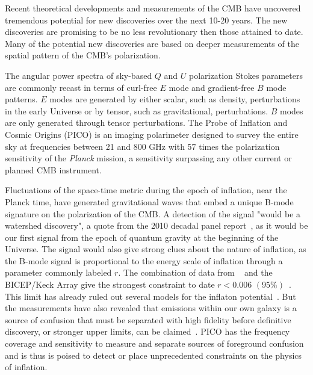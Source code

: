\documentclass[PICOReport.tex]{subfiles}
\begin{document}

Recent theoretical developments and measurements of the \ac{CMB} 
have uncovered tremendous potential for new discoveries over the next 10-20 years. The new discoveries are promising to be 
no less revolutionary then those attained to date. Many of the potential new discoveries are based on deeper
measurements of the spatial pattern of the CMB's polarization. 

The angular power spectra of sky-based $Q$ and $U$ polarization Stokes parameters are commonly recast in terms
of curl-free $E$ mode and gradient-free $B$ mode patterns. $E$ modes are generated by either scalar, such as density, perturbations
in the early Universe or by tensor, such as gravitational, perturbations. $B$ modes are only generated through tensor
perturbations. The Probe of Inflation and Cosmic Origins (PICO) is an imaging polarimeter designed to survey the entire 
sky at frequencies between 21 and 800 GHz with 57 times the polarization sensitivity of the {\it Planck} mission, a sensitivity 
surpassing any other current or planned CMB instrument. 

Fluctuations of the space-time metric during the epoch of inflation, near the Planck time, have generated gravitational waves 
that embed a unique B-mode signature on the polarization of the CMB. A detection of the signal "would be a watershed discovery", 
a quote from the 2010 decadal panel report~\citep{nwnh}, as it would be our first signal from the epoch of quantum gravity 
at the beginning of the Universe. The signal would also give strong clues 
about the nature of inflation, as the B-mode signal is proportional to the energy scale of inflation through a parameter 
commonly labeled $r$. 
The combination of data from \planck~ and the BICEP/Keck Array give the strongest constraint to date 
$r<0.006\,\, (95\%)$~\citep{rlimit}.  This limit has already ruled out several 
models for the inflaton potential~\citep{planck2018inflation}. 
But the measurements have also 
revealed that emissions within our own galaxy is a source of confusion that must be separated with high fidelity 
before definitive discovery, or stronger upper limits, can be claimed~\citep{whichplanck}. 
PICO has the frequency coverage and sensitivity to measure and separate sources of foreground confusion and is thus 
is poised to detect or place unprecedented constraints on the physics of inflation. 
\end{document}
